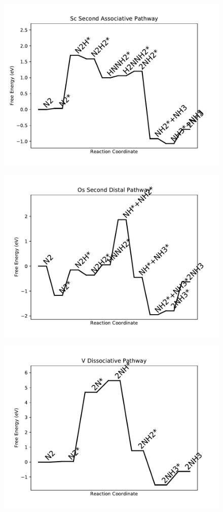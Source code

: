 \begin{figure}
\includegraphics[width=0.8\linewidth]{data/plots/Sc_associative_2.pdf}
\end{figure}

\begin{figure}
\includegraphics[width=0.8\linewidth]{data/plots/Os_distal_2.pdf}
\end{figure}

\begin{figure}
\includegraphics[width=0.8\linewidth]{data/plots/V_dissociative.pdf}
\end{figure}

